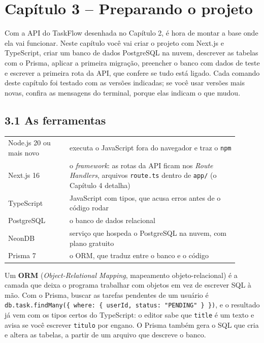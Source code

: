 \section{Capítulo 3 -- Preparando o projeto}

Com a API do TaskFlow desenhada no Capítulo 2, é hora de montar a base onde ela vai funcionar. Neste capítulo você vai criar o projeto com Next.js e TypeScript, criar um banco de dados PostgreSQL na nuvem, descrever as tabelas com o Prisma, aplicar a primeira migração, preencher o banco com dados de teste e escrever a primeira rota da API, que confere se tudo está ligado. Cada comando deste capítulo foi testado com as versões indicadas; se você usar versões mais novas, confira as mensagens do terminal, porque elas indicam o que mudou.

\subsection{3.1 As ferramentas}

\begin{center}
\begin{tabular}{@{}P{0.24\linewidth}P{0.66\linewidth}@{}}
\toprule
{}
 &  \\
\midrule
Node.js 20 ou mais novo & executa o JavaScript fora do navegador e traz o \texttt{npm} \\
 Next.js 16 & o \textit{framework}: as rotas da API ficam nos \textit{Route Handlers}, arquivos \texttt{route.ts} dentro de \texttt{app/} (o Capítulo 4 detalha) \\
TypeScript & JavaScript com tipos, que acusa erros antes de o código rodar \\
 PostgreSQL & o banco de dados relacional \\
NeonDB & serviço que hospeda o PostgreSQL na nuvem, com plano gratuito \\
 Prisma 7 & o ORM, que traduz entre o banco e o código \\
\bottomrule
\end{tabular}
\end{center}

Um \textbf{ORM} (\textit{Object-Relational Mapping}, mapeamento objeto-relacional) é a camada que deixa o programa trabalhar com objetos em vez de escrever SQL à mão. Com o Prisma, buscar as tarefas pendentes de um usuário é \texttt{db.task.findMany(\{ where: \{ userId, status: "PENDING" \} \})}, e o resultado já vem com os tipos certos do TypeScript: o editor sabe que \texttt{title} é um texto e avisa se você escrever \texttt{titulo} por engano. O Prisma também gera o SQL que cria e altera as tabelas, a partir de um arquivo que descreve o banco.

